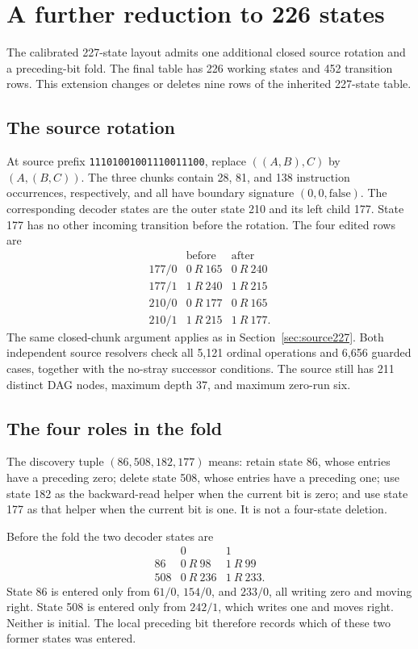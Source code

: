 \section{A further reduction to 226 states}
\label{sec:extension226}

The calibrated 227-state layout admits one additional closed source
rotation and a preceding-bit fold.  The final table has 226 working
states and 452 transition rows.  This extension changes or deletes nine
rows of the inherited 227-state table.

\subsection{The source rotation}

At source prefix \texttt{11101001001110011100}, replace
$((A,B),C)$ by $(A,(B,C))$.  The three chunks contain 28, 81, and 138
instruction occurrences, respectively, and all have boundary signature
$(0,0,\mathrm{false})$.  The corresponding decoder states are the outer
state 210 and its left child 177.  State 177 has no other incoming
transition before the rotation.  The four edited rows are
\[
\begin{array}{c|cc}
 &\text{before}&\text{after}\\\hline
177/0&0\ R\ 165&0\ R\ 240\\
177/1&1\ R\ 240&1\ R\ 215\\
210/0&0\ R\ 177&0\ R\ 165\\
210/1&1\ R\ 215&1\ R\ 177.
\end{array}
\]
The same closed-chunk argument applies as in
Section~\ref{sec:source227}.  Both independent source resolvers check
all 5,121 ordinal operations and 6,656 guarded cases, together with the
no-stray successor conditions.  The source still has 211 distinct DAG
nodes, maximum depth 37, and maximum zero-run six.

\subsection{The four roles in the fold}

The discovery tuple $(86,508,182,177)$ means: retain state 86, whose
entries have a preceding zero; delete state 508, whose entries have a
preceding one; use state 182 as the backward-read helper when the
current bit is zero; and use state 177 as that helper when the current
bit is one.  It is not a four-state deletion.

Before the fold the two decoder states are
\[
\begin{array}{c|cc}
 &0&1\\\hline
86&0\ R\ 98&1\ R\ 99\\
508&0\ R\ 236&1\ R\ 233.
\end{array}
\]
State 86 is entered only from $61/0$, $154/0$, and $233/0$, all writing
zero and moving right.  State 508 is entered only from $242/1$, which
writes one and moves right.  Neither is initial.  The local preceding
bit therefore records which of these two former states was entered.

